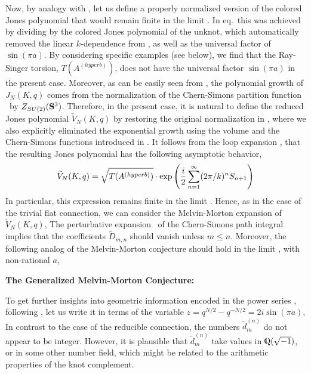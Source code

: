 Now, by analogy with \vnjones, let us define a properly normalized
version of the colored Jones polynomial that would remain finite
in the limit \thelimit.
In eq.\vnjones\ this was achieved by dividing by the colored
Jones polynomial of the unknot, which automatically removed
the linear $k$-dependence from \trivjones, as well as the universal
factor of $\sin (\pi a)$.
By considering specific examples (see below), we find that
the Ray-Singer torsion, $T (A^{(hyperb)})$, does not have
the universal factor $\sin (\pi a)$ in the present case.
Moreover, as can be easily seen from \lognjones,
the polynomial growth of $J_N (K,q)$ comes from the normalization
of the Chern-Simons partition function \leadingz\ by $Z_{SU(2)} (\S^3)$.
Therefore, in the present case, it is natural to define
the reduced Jones polynomial $\tilde V_N (K,q)$
by restoring the original normalization in \leadingz,
%
\eqn{}
%
where we also explicitly eliminated the exponential growth using
the volume and the Chern-Simons functions introduced in \csvolint.
It follows from the loop expansion \leadingz, that
the resulting Jones polynomial has the following asymptotic behavior,
$$
\tilde V_N (K,q) = \sqrt{T (A^{(hyperb)})} \cdot
\exp \left({i \over 2} \sum_{n=1}^{\infty} (2\pi/k)^n S_{n+1} \right)
$$
In particular, this expression remains finite in the limit \thelimit.
Hence, as in the case of the trivial flat connection,
we can consider the Melvin-Morton expansion of $\tilde V_N (K,q)$,
%
\eqn{}
%
The perturbative expansion \zcseries\ of the Chern-Simons path
integral implies that the coefficients $\tilde D_{m,n}$ should
vanish unless $m \le n$.
Moreover, the following analog of the Melvin-Morton conjecture
should hold in the limit \thelimit, with non-rational $a$,

{\bf The Generalized Melvin-Morton Conjecture:}
%
\eqn{}
%

To get further insights into geometric information encoded
in the power series \newmmexpansion, following \Rozhigher,
let us write it in terms of the variable
$z = q^{N/2} - q^{-N/2} = 2i \sin (\pi a)$,
%
\eqn{}
%
In contrast to the case of the reducible connection,
the numbers $\tilde d_m^{(n)}$ do not appear to be integer.
However, it is plausible that $\tilde d_m^{(n)}$ take
values in $\IQ(\sqrt{-1})$, or in some other number field,
which might be related to the arithmetic properties of
the knot complement.

